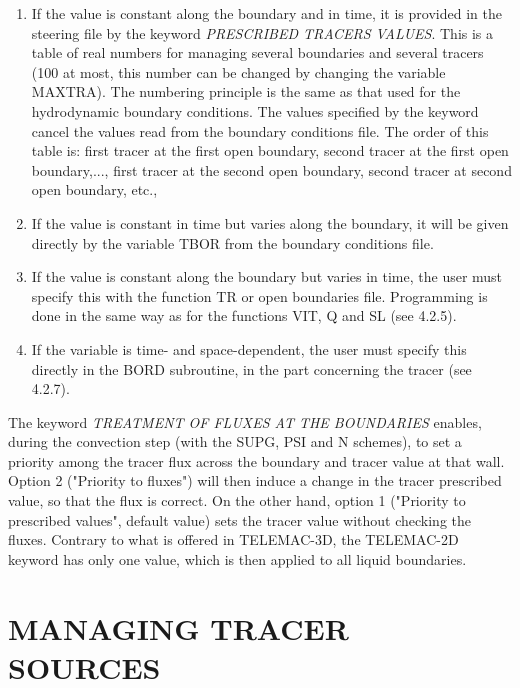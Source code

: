 \begin{enumerate}
\item [\nonumber] If the value is constant along the boundary and in time, it is provided in the steering file by the keyword \textit{PRESCRIBED TRACERS VALUES}. This is a table of real numbers for managing several boundaries and several tracers (100 at most, this number can be changed by changing the variable MAXTRA). The numbering principle is the same as that used for the hydrodynamic boundary conditions. The values specified by the keyword cancel the values read from the boundary conditions file. The order of this table is: first tracer at the first open boundary, second tracer at the first open boundary,..., first tracer at the second open boundary, second tracer at second open boundary, etc.,

\item [\nonumber] If the value is constant in time but varies along the boundary, it will be given directly by the variable TBOR from the boundary conditions file.

\item [\nonumber] If the value is constant along the boundary but varies in time, the user must specify this with the function TR or open boundaries file. Programming is done in the same way as for the functions VIT, Q and SL (see 4.2.5).

\item [\nonumber] If the variable is time- and space-dependent, the user must specify this directly in the BORD subroutine, in the part concerning the tracer (see 4.2.7).
\end{enumerate}

 The keyword \textit{TREATMENT OF FLUXES AT THE BOUNDARIES} enables, during the convection step (with the SUPG, PSI and N schemes), to set a priority among the tracer flux across the boundary and tracer value at that wall. Option 2 ("Priority to fluxes") will then induce a change in the tracer prescribed value, so that the flux is correct. On the other hand, option 1 ("Priority to prescribed values", default value) sets the tracer value without checking the fluxes. Contrary to what is offered in TELEMAC-3D, the TELEMAC-2D keyword has only one value, which is then applied to all liquid boundaries.


\section{  MANAGING TRACER SOURCES}

